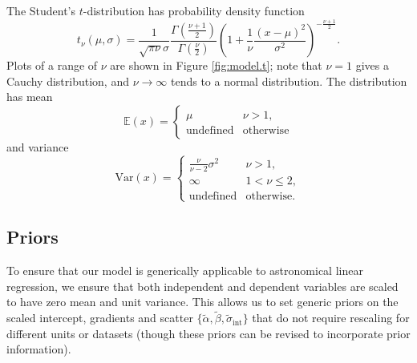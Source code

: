 \documentclass[fleqn,usenatbib]{mnras}
\newcommand{\studentt}[2]{t_\nu \left( #1, #2 \right)}
\newcommand{\intercept}{\alpha}
\newcommand{\covariate}{\beta}
\begin{document}
The Student's $t$-distribution has probability density function
\begin{equation}
    \studentt{\mu}{\sigma}
        =
    \frac{1}{\sqrt{\pi \nu} \sigma}
    \frac{
        \Gamma \left(\frac{\nu + 1}2\right)
    }{
        \Gamma \left(\frac{\nu}2\right)
    }
    \left(
        1 + \frac{1}{\nu} \frac{\left(x - \mu\right)^2}{\sigma^2}
    \right)^{
        -\frac{\nu + 1}{2}
    }.
\end{equation}
Plots of a range of $\nu$ are shown in Figure \ref{fig:model.t}; note that $\nu
= 1$ gives a Cauchy distribution, and $\nu \rightarrow \infty$ tends to a normal
distribution. The distribution has mean
\begin{equation}
    \mathbb{E}(x)
        =
    \begin{cases}
        \mu & \nu > 1, \\
        \textrm{undefined} & \textrm{otherwise}
    \end{cases}
\end{equation}
and variance
\begin{equation}
    \mathrm{Var}(x)
        =
    \begin{cases}
        \frac{\nu}{\nu - 2} \sigma^2 & \nu > 1, \\
        \infty & 1 < \nu \leq 2, \\
        \textrm{undefined} & \textrm{otherwise.}
    \end{cases}
\end{equation}

\subsection{Priors}
\label{sec:formalism.prior}

To ensure that our model is generically applicable to astronomical linear
regression, we ensure that both independent and dependent variables are scaled
to have zero mean and unit variance. This allows us to set generic priors on the
scaled intercept, gradients and scatter $\{\tilde{\intercept},
\tilde{\covariate}, \tilde{\sigma}_{\text{int}}\}$ that do not require rescaling for
different units or datasets (though these priors can be revised to incorporate
prior information).
\end{document}
